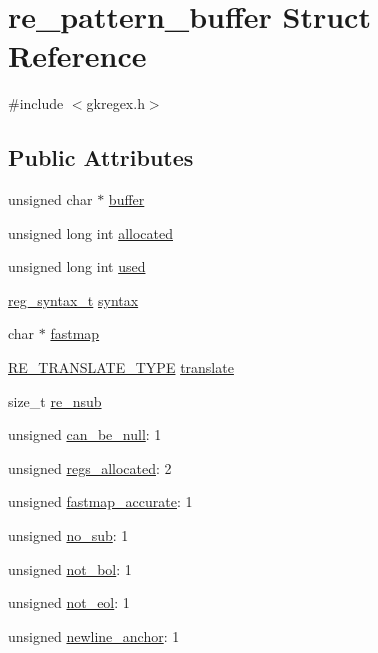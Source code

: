 \hypertarget{structre__pattern__buffer}{}\section{re\+\_\+pattern\+\_\+buffer Struct Reference}
\label{structre__pattern__buffer}


{\ttfamily \#include $<$gkregex.\+h$>$}

\subsection*{Public Attributes}
\begin{DoxyCompactItemize}
\item 
unsigned char $\ast$ \hyperlink{structre__pattern__buffer_ae60c7055854785bf6e2743fd314fcb83}{buffer}
\item 
unsigned long int \hyperlink{structre__pattern__buffer_a2947439f970297ce6f4a439867c0b5c7}{allocated}
\item 
unsigned long int \hyperlink{structre__pattern__buffer_a5c6bb086f4bfebee8aa4373c03bcc74b}{used}
\item 
\hyperlink{gkregex_8h_a7e0565199a2fabaca3d67a5a44fc4229}{reg\+\_\+syntax\+\_\+t} \hyperlink{structre__pattern__buffer_aa16e95a1befa7d5fd8eb89542fa065f8}{syntax}
\item 
char $\ast$ \hyperlink{structre__pattern__buffer_a103ac216c8fd6a8734daa4999fca3efb}{fastmap}
\item 
\hyperlink{gkregex_8h_a96c9fb9c7074cb21740b63092b0637a4}{R\+E\+\_\+\+T\+R\+A\+N\+S\+L\+A\+T\+E\+\_\+\+T\+Y\+PE} \hyperlink{structre__pattern__buffer_a780f81d1ec1ebba869e138b5bc849658}{translate}
\item 
size\+\_\+t \hyperlink{structre__pattern__buffer_a703c2069a09bac7fa67de8871cb17d35}{re\+\_\+nsub}
\item 
unsigned \hyperlink{structre__pattern__buffer_a13807f7bf4b32d786eb9e17a3c4d3124}{can\+\_\+be\+\_\+null}\+: 1
\item 
unsigned \hyperlink{structre__pattern__buffer_a83388321c434be6ac33fe359a3d7b449}{regs\+\_\+allocated}\+: 2
\item 
unsigned \hyperlink{structre__pattern__buffer_a837b026312b860e5485da6240b10d8f7}{fastmap\+\_\+accurate}\+: 1
\item 
unsigned \hyperlink{structre__pattern__buffer_a83e122c96edb258aa4ef99d7a8b2bfa2}{no\+\_\+sub}\+: 1
\item 
unsigned \hyperlink{structre__pattern__buffer_a4a5d480a0891afbab92cf486a04e4a68}{not\+\_\+bol}\+: 1
\item 
unsigned \hyperlink{structre__pattern__buffer_a875954f4e64b585471f67b334d33799c}{not\+\_\+eol}\+: 1
\item 
unsigned \hyperlink{structre__pattern__buffer_a46ed7a16b4cb87267ac5d219dab3536a}{newline\+\_\+anchor}\+: 1
\end{DoxyCompactItemize}


